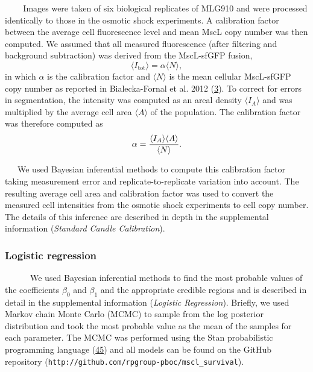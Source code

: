 ~ ~
~Images
were
taken
of six
biological
replicates
of
MLG910
and
were
processed
identically
to
those
in the
osmotic
shock
experiments.
A
calibration
factor
between
the
average
cell
fluorescence
level
and
mean
MscL
copy
number
was
then
computed.
We
assumed
that
all
measured
fluorescence
(after
filtering
and
background
subtraction)
was
derived
from
the
MscL-sfGFP
fusion,
\begin{equation}
\langle I_\text{tot}\rangle = \alpha \langle N \rangle,
\label{eq:ian}\end{equation}
in
which
\(\alpha\)
is the
calibration
factor
and
\(\langle N \rangle\)
is the
mean
cellular
MscL-sfGFP
copy
number
as
reported
in
Bialecka-Fornal
et al.
2012
(\protect\hyperlink{ref-bialecka-fornal2012}{3}).
To
correct
for
errors
in
segmentation,
the
intensity
was
computed
as an
areal
density
\(\langle I_A \rangle\)
and
was
multiplied
by the
average
cell
area
\(\langle A \rangle\)
of the
population.
The
calibration
factor
was
therefore
computed
as
\begin{equation}
\alpha = {\langle I_A \rangle \langle A \rangle \over \langle N \rangle}.
\label{eq:calibration_factor}\end{equation}

~~~We
used
Bayesian
inferential
methods
to
compute
this
calibration
factor
taking
measurement
error
and
replicate-to-replicate
variation
into
account.
The
resulting
average
cell
area
and
calibration
factor
was
used
to
convert
the
measured
cell
intensities
from
the
osmotic
shock
experiments
to
cell
copy
number.
The
details
of
this
inference
are
described
in
depth
in the
supplemental
information
(\emph{Standard
Candle
Calibration}).

\subsubsection{Logistic
regression}\label{logistic-regression}

~ ~ ~
~We
used
Bayesian
inferential
methods
to
find
the
most
probable
values
of the
coefficients
\(\beta_0\)
and
\(\beta_1\)
and
the
appropriate
credible
regions
and is
described
in
detail
in the
supplemental
information
(\emph{Logistic
Regression}).
Briefly,
we
used
Markov
chain
Monte
Carlo
(MCMC)
to
sample
from
the
log
posterior
distribution
and
took
the
most
probable
value
as the
mean
of the
samples
for
each
parameter.
The
MCMC
was
performed
using
the
Stan
probabilistic
programming
language
(\protect\hyperlink{ref-carpenter2017}{45})
and
all
models
can be
found
on the
GitHub
repository
(\texttt{http://github.com/rpgroup-pboc/mscl\_survival}).

